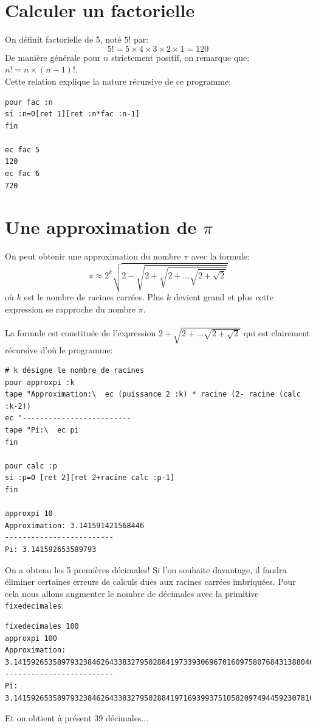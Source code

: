 \section{Calculer un factorielle}
\label{factorielle}
\noindent On définit factorielle de 5, noté $5!$ par:
 $$5!=5\times4\times3\times2\times1=120$$
De manière générale pour $n$ strictement positif, on remarque que: $n!=n\times(n-1)!$.\\
Cette relation explique la nature récursive de ce programme:
\begin{verbatim}
pour fac :n
si :n=0[ret 1][ret :n*fac :n-1]
fin

ec fac 5
120
ec fac 6
720
\end{verbatim} 
 \section{Une approximation de $\pi$}
\label{approx-pi}
\noindent On peut obtenir une approximation du nombre $\pi$ avec la formule:
$$\pi\approx2^k\sqrt{2-\sqrt{2+\sqrt{2+\ldots\sqrt{2+\sqrt2}}}}$$ où $k$ est le nombre de racines carrées. Plus $k$ devient grand et plus cette expression se rapproche du nombre $\pi$.\\ \\
La formule est constituée de l'expression $2+\sqrt{2+\ldots\sqrt{2+\sqrt2}}$ qui est clairement récursive d'où le programme:
\begin{verbatim}
# k désigne le nombre de racines
pour approxpi :k
tape "Approximation:\  ec (puissance 2 :k) * racine (2- racine (calc :k-2))
ec "-------------------------
tape "Pi:\  ec pi
fin

pour calc :p
si :p=0 [ret 2][ret 2+racine calc :p-1]
fin

approxpi 10
Approximation: 3.141591421568446 
------------------------- 
Pi: 3.141592653589793 
\end{verbatim}
On a obtenu les 5 premières décimales! Si l'on souhaite davantage, il faudra éliminer certaines erreurs de calculs dues aux racines carrées imbriquées. Pour cela nous allons augmenter le nombre de décimales avec la primitive \texttt{fixedecimales}.
\begin{verbatim}
fixedecimales 100
approxpi 100
Approximation: 3.1415926535897932384626433832795028841973393069670160975807684313880468...
------------------------- 
Pi: 3.141592653589793238462643383279502884197169399375105820974944592307816406....
\end{verbatim}
Et on obtient à présent 39 décimales...